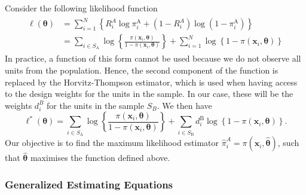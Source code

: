 \documentclass[
]{jss}
\begin{document}
Consider the following likelihood function \begin{align}
    \begin{split}
 \ell(\boldsymbol{\theta}) & =\sum_{i=1}^N\left\{R_i^A \log \pi_i^{\mathrm{A}}+\left(1-R_i^A\right) \log \left(1-\pi_i^{\mathrm{A}}\right)\right\} \\ & =\sum_{i \in S_{\mathrm{A}}} \log \left\{\frac{\pi\left(\boldsymbol{x}_i, \boldsymbol{\theta}\right)}{1-\pi\left(\boldsymbol{x}_i, \boldsymbol{\theta}\right)}\right\}+\sum_{i=1}^N \log \left\{1-\pi\left(\boldsymbol{x}_i, \boldsymbol{\theta}\right)\right\}
    \end{split}
\end{align} In practice, a function of this form cannot be used because
we do not observe all units from the population. Hence, the second
component of the function is replaced by the Horvitz-Thompson estimator,
which is used when having access to the design weights for the units in
the sample. In our case, these will be the weights \(d_i^B\) for the
units in the sample \(S_B\). We then have \begin{equation}
\ell^*(\boldsymbol{\theta})=\sum_{i \in S_{\mathrm{A}}} \log \left\{\frac{\pi\left(\boldsymbol{x}_i, \boldsymbol{\theta}\right)}{1-\pi\left(\boldsymbol{x}_i, \boldsymbol{\theta}\right)}\right\}+\sum_{i \in S_{\mathrm{B}}} d_i^{\mathrm{B}} \log \left\{1-\pi\left(\boldsymbol{x}_i, \boldsymbol{\theta}\right)\right\}.
\end{equation} Our objective is to find the maximum likelihood estimator
\(\hat{\pi}_{i}^{A} = \pi(\boldsymbol{x}_{i}, \hat{\boldsymbol{\theta}})\),
such that \(\hat{\boldsymbol{\theta}}\) maximises the function defined
above.

\hypertarget{generalized-estimating-equations}{%
\subsubsection{Generalized Estimating
Equations}\label{generalized-estimating-equations}}
\end{document}
